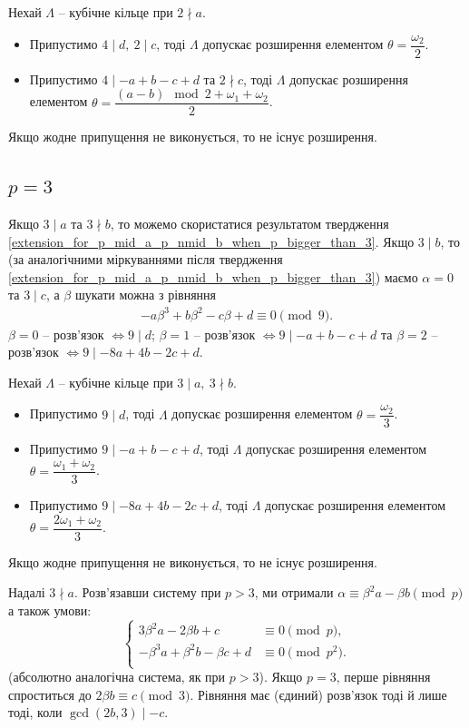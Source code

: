 \documentclass{thesis}
\begin{document}
\begin{proposition}
Нехай $\Lambda$ -- кубічне кільце при $2 \nmid a$.
\begin{itemize}
\item Припустимо $4 \mid d,\ 2 \mid c$, тоді $\Lambda$ допускає розширення елементом $\theta = \dfrac{\omega_2}{2}$.
\item Припустимо $4 \mid -a+b-c+d$ та $2 \nmid c$, тоді $\Lambda$ допускає розширення елементом $\theta = \dfrac{(a-b) \mod 2 + \omega_1 + \omega_2}{2}$. 
\end{itemize}
Якщо жодне припущення не виконується, то не існує розширення.
\end{proposition}

\subsection*{$p = 3$}
Якщо $3 \mid a$ та $3 \nmid b$, то можемо скористатися результатом твердження \ref{extension_for_p_mid_a_p_nmid_b_when_p_bigger_than_3}. Якщо $3 \mid b$, то (за аналогічними міркуваннями після твердження \ref{extension_for_p_mid_a_p_nmid_b_when_p_bigger_than_3}) маємо $\alpha = 0$ та $3 \mid c$, а $\beta$ шукати можна з рівняння
\begin{align*}
-a \beta^3 + b \beta^2 - c \beta + d \equiv 0 \pmod {9}.
\end{align*}
$\beta = 0$ -- розв'язок $\iff 9 \mid d$; $\beta = 1$ -- розв'язок $\iff 9 \mid -a+b-c+d$ та $\beta = 2$ -- розв'язок $\iff 9 \mid -8a+4b-2c+d$.

\begin{proposition}
Нехай $\Lambda$ -- кубічне кільце при $3 \mid a,\ 3 \nmid b$.
\begin{itemize}
\item Припустимо $9 \mid d$, тоді $\Lambda$ допускає розширення елементом $\theta = \dfrac{\omega_2}{3}$.
\item Припустимо $9 \mid -a+b-c+d$, тоді $\Lambda$ допускає розширення елементом $\theta = \dfrac{\omega_1+\omega_2}{3}$.
\item Припустимо $9 \mid -8a+4b-2c+d$, тоді $\Lambda$ допускає розширення елементом $\theta = \dfrac{2\omega_1+\omega_2}{3}$.
\end{itemize}
Якщо жодне припущення не виконується, то не існує розширення.
\end{proposition}

Надалі $3 \nmid a$. Розв'язавши систему при $p>3$, ми отримали $\alpha \equiv \beta^2 a - \beta b \pmod p$ а також умови:
\begin{equation*}
\begin{cases}
3 \beta^2 a - 2 \beta b + c & \equiv 0 \pmod p, \\
-\beta^3 a + \beta^2 b - \beta c + d & \equiv 0 \pmod {p^2}. \\
\end{cases}
\end{equation*}
(абсолютно аналогічна система, як при $p > 3$). Якщо $p = 3$, перше рівняння спроститься до $2\beta b \equiv c \pmod 3$. Рівняння має (єдиний) розв'язок тоді й лише тоді, коли $\gcd(2b,3) \mid -c$.
\end{document}
